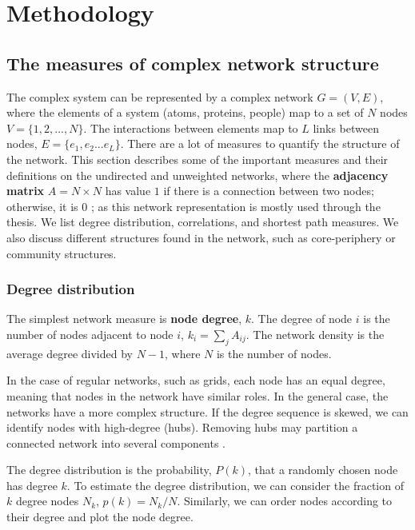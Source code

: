 \chapter{Methodology} %
\label{Ch:Method}

\section{The measures of complex network structure}

The complex system can be represented by a complex network $G=(V, E)$, where the elements of a system (atoms, proteins, people) map to a set of $N$ nodes $V=\{1, 2, ..., N\}$. The interactions between elements map to $L$ links between nodes, $E = \{ e_1, e_2... e_L\}$. There are a lot of measures to quantify the structure of the network. This section describes some of the important measures and their definitions on the undirected and unweighted networks, where the \textbf{adjacency matrix} ${A} = N \times N$ has value $1$ if there is a connection between two nodes; otherwise, it is $0$ \cite{boccaletti2006complex}; as this network representation is mostly used through the thesis. We list degree distribution, correlations, and shortest path measures. We also discuss different structures found in the network, such as core-periphery or community structures.   

\subsection{Degree distribution}

The simplest network measure is \textbf{node degree}, $k$. The degree of node $i$ is the number of nodes adjacent 
to node $i$, $k_i = \sum_j A_{ij}$. The network density is the average degree divided by $N-1$, where $N$ is the number of nodes. 
 
In the case of regular networks, such as grids, each node has an equal degree, meaning that nodes in the network have similar roles. In the general case, the networks have a more complex structure. If the degree sequence is skewed, we can identify nodes with high-degree (hubs). Removing hubs may partition a connected network into several components \cite{albert2000error}.
 
The degree distribution is the probability, $P(k)$, that a randomly chosen node has degree $k$. To estimate the degree distribution, we can consider the fraction of $k$ degree nodes $N_k$, $p(k) = N_k/N$. Similarly, we can order nodes according to their degree and plot the node degree.


